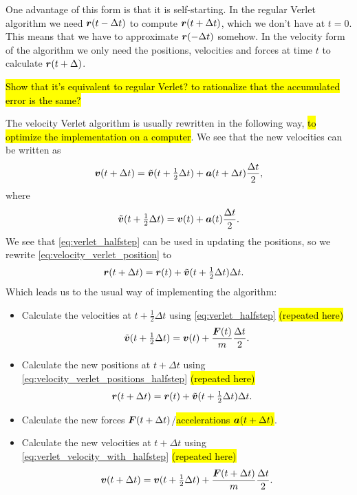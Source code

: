 One advantage of this form is that it is self-starting. In the regular Verlet algorithm we need $\boldsymbol{r}(t-\Delta t)$ to compute $\boldsymbol{r}(t+\Delta t)$, which we don't have at $t = 0$. This means that we have to approximate $\boldsymbol{r}(-\Delta t)$ somehow. In the velocity form of the algorithm we only need the positions, velocities and forces at time $t$ to calculate $\boldsymbol{r}(t+\Delta)$.

\hl{Show that it's equivalent to regular Verlet? to rationalize that the accumulated error is the same?}

The velocity Verlet algorithm is usually rewritten in the following way, \hl{to optimize the implementation on a computer}. We see that the new velocities can be written as
\begin{align}
    \boldsymbol{v}(t+\Delta t) = \tilde{\boldsymbol{v}}(t + \tfrac{1}{2}\Delta t) + \boldsymbol{a}(t+\Delta t)\frac{\Delta t}{2}, \label{eq:verlet_velocity_with_halfstep}
\end{align}
where
\begin{align}
    \tilde{\boldsymbol{v}}(t + \tfrac{1}{2}\Delta t) = \boldsymbol{v}(t) + \boldsymbol{a}(t)\frac{\Delta t}{2}.\label{eq:verlet_halfstep}
\end{align}
We see that \cref{eq:verlet_halfstep} can be used in updating the positions, so we rewrite \cref{eq:velocity_verlet_position} to
\begin{align}
    \boldsymbol{r}(t + \Delta t) &= \boldsymbol{r}(t) + \tilde{\boldsymbol{v}}(t+\tfrac{1}{2}\Delta t)\Delta t.\label{eq:velocity_verlet_positions_halfstep}
\end{align}
Which leads us to the usual way of implementing the algorithm\cite{allen1989computer}:
\begin{itemize}
    \item Calculate the velocities at $t+\tfrac{1}{2}\Delta t$ using \cref{eq:verlet_halfstep} \hl{(repeated here)}
    \begin{align*}
        \tilde{\boldsymbol{v}}(t + \tfrac{1}{2}\Delta t) = \boldsymbol{v}(t) + \frac{\boldsymbol{F}(t)}{m}\frac{\Delta t}{2}.
    \end{align*}
    \item Calculate the new positions at $t + \Delta t$ using \cref{eq:velocity_verlet_positions_halfstep} \hl{(repeated here)}
    \begin{align*}
        \boldsymbol{r}(t + \Delta t) &= \boldsymbol{r}(t) + \tilde{\boldsymbol{v}}(t+\tfrac{1}{2}\Delta t)\Delta t.
    \end{align*}
    \item Calculate the new forces $\boldsymbol{F}(t+\Delta t)$/\hl{accelerations $\boldsymbol{a}(t+\Delta t)$}.
    \item Calculate the new velocities at $t+\Delta t$ using \cref{eq:verlet_velocity_with_halfstep} \hl{(repeated here)}
    \begin{align*}
        \boldsymbol{v}(t+\Delta t) = \boldsymbol{v}(t + \tfrac{1}{2}\Delta t) + \frac{\boldsymbol{F}(t + \Delta t)}{m}\frac{\Delta t}{2}.
    \end{align*}
\end{itemize}
